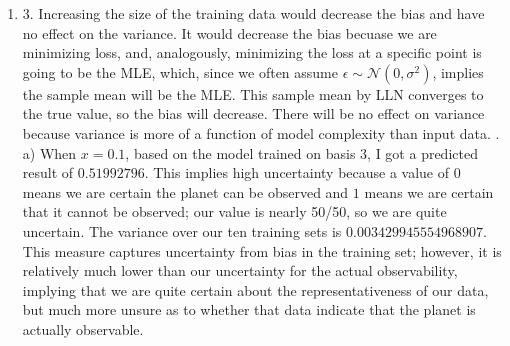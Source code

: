 \documentclass[submit]{harvardml}
\newenvironment{ans}{
  \begin{enumerate}
  \color{blue}
}{
  \end{enumerate}
  \color{black}
}
\begin{document}
\begin{ans}
    \newline 
    . As we discussed in class, the Bias-Variance Tradeoff is that  increasing model complexity decreases error but increases the risk of overfitting and vice versa. We can see this here: for the models with bases of lower degrees, there is very high error (since the linear model cannot account for nonlinear trends), but a very low risk of overfitting (the model can hardly fit to the actual data, so, of course, it is not going to fit to the noise); conversely, for the models with high-dimensional bases, the output is more jagged than the ground-truth, so it is overfit to the noisy input data, but the variance on that input data is very low. That is, the fit to the data becomes better and better as we increase the dimensionality of our bases, but, as the dimension gets too high, the model overfits, and fits the ground-truth model worse and worse. Out of these three options, basis 3 seems to best approximate the ground truth. 
    \newline
    \newline
    \item 3. Increasing the size of the training data would decrease the bias and have no effect on the variance. It would decrease the bias becuase we are minimizing loss, and, analogously, minimizing the loss at a specific point is going to be the MLE, which, since we often assume $\epsilon \sim \mathcal N(0, \sigma^2)$, implies the sample mean will be the MLE. This sample mean by LLN converges to the true value, so the bias will decrease. There will be no effect on variance because variance is more of a function of model complexity than input data. 
    \newline
    .
    \newline
    \qquad a) When $x = 0.1$, based on the model trained on basis 3, I got a predicted result of $0.51992796$. This implies high uncertainty because a value of $0$ means we are certain the planet can be observed and $1$ means we are certain that it cannot be observed; our value is nearly 50/50, so we are quite uncertain. The variance over our ten training sets is $0.003429945554968907$. This measure captures uncertainty from bias in the training set; however, it is relatively much lower than our uncertainty for the actual observability, implying that we are quite certain about the representativeness of our data, but much more unsure as to whether that data indicate that the planet is actually observable. 

\end{ans}
\end{document}
